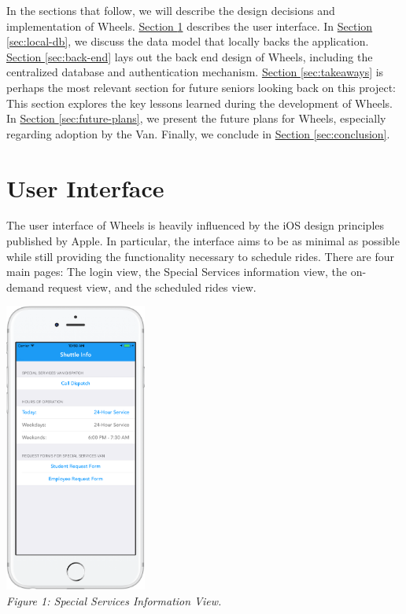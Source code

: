 \documentclass[12pt, a4paper]{article}
\begin{document}
\begin{multicols*}{2}
In the sections that follow, we will describe the design decisions and implementation of Wheels. \hyperref[sec:user-interface]{Section \ref{sec:user-interface}} describes the user interface. In \hyperref[sec:local-db]{Section \ref{sec:local-db}}, we discuss the data model that locally backs the application. \hyperref[sec:back-end]{Section \ref{sec:back-end}} lays out the back end design of Wheels, including the centralized database and authentication mechanism. \hyperref[sec:takeaways]{Section \ref{sec:takeaways}} is perhaps the most relevant section for future seniors looking back on this project: This section explores the key lessons learned during the development of Wheels. In \hyperref[sec:future-plans]{Section \ref{sec:future-plans}}, we present the future plans for Wheels, especially regarding adoption by the Van. Finally, we conclude in \hyperref[sec:conclusion]{Section \ref{sec:conclusion}}.
\section{User Interface}\label{sec:user-interface}
The user interface of Wheels is heavily influenced by the iOS design principles published by Apple. In particular, the interface aims to be as minimal as possible while still providing the functionality necessary to schedule rides. There are four main pages: The login view, the Special Services information view, the on-demand request view, and the scheduled rides view.
\begin{center}
	\includegraphics[keepaspectratio=true, width=0.35\textwidth]{screenshot-5.png}\\
	\textit{Figure 1: Special Services Information View.}
\end{center}


\end{multicols*}
\end{document}
